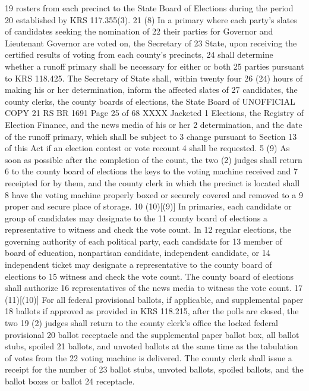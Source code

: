 19 rosters from each precinct to the State Board of Elections during the period
20 established by KRS 117.355(3).
21 (8) In a primary where each party's slates of candidates seeking the nomination of
22 their parties for Governor and Lieutenant Governor are voted on, the Secretary of
23 State, upon receiving the certified results of voting from each county's precincts,
24 shall determine whether a runoff primary shall be necessary for either or both
25 parties pursuant to KRS 118.425. The Secretary of State shall, within twenty four
26 (24) hours of making his or her determination, inform the affected slates of
27 candidates, the county clerks, the county boards of elections, the State Board of 
UNOFFICIAL COPY 21 RS BR 1691
Page 25 of 68
XXXX Jacketed
1 Elections, the Registry of Election Finance, and the news media of his or her
2 determination, and the date of the runoff primary, which shall be subject to
3 change pursuant to Section 13 of this Act if an election contest or vote recount
4 shall be requested.
5 (9) As soon as possible after the completion of the count, the two (2) judges shall return
6 to the county board of elections the keys to the voting machine received and
7 receipted for by them, and the county clerk in which the precinct is located shall
8 have the voting machine properly boxed or securely covered and removed to a
9 proper and secure place of storage.
10 (10)[(9)] In primaries, each candidate or group of candidates may designate to the
11 county board of elections a representative to witness and check the vote count. In
12 regular elections, the governing authority of each political party, each candidate for
13 member of board of education, nonpartisan candidate, independent candidate, or
14 independent ticket may designate a representative to the county board of elections to
15 witness and check the vote count. The county board of elections shall authorize
16 representatives of the news media to witness the vote count.
17 (11)[(10)] For all federal provisional ballots, if applicable, and supplemental paper
18 ballots if approved as provided in KRS 118.215, after the polls are closed, the two
19 (2) judges shall return to the county clerk's office the locked federal provisional
20 ballot receptacle and the supplemental paper ballot box, all ballot stubs, spoiled
21 ballots, and unvoted ballots at the same time as the tabulation of votes from the
22 voting machine is delivered. The county clerk shall issue a receipt for the number of
23 ballot stubs, unvoted ballots, spoiled ballots, and the ballot boxes or ballot
24 receptacle.
